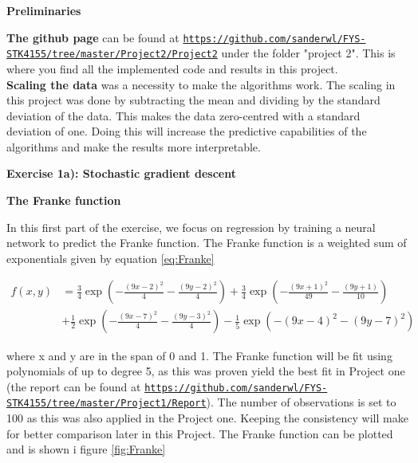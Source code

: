 \documentclass[12pt,a4paper]{article}
\begin{document}
\newpage

\begin{center}
\Large{\textbf{Preliminaries}}
\end{center}

\noindent \textbf{The github page} can be found at \href{{https://github.com/sanderwl/FYS-STK4155/tree/master/Project2/Project2}}{\nolinkurl{https://github.com/sanderwl/FYS-STK4155/tree/master/Project2/Project2}} under the folder "project 2". This is where you find all the implemented code and results in this project.
\\
\textbf{Scaling the data} was a necessity to make the algorithms work. The scaling in this project was done by subtracting the mean and dividing by the standard deviation of the data. This makes the data zero-centred with a standard deviation of one. Doing this will increase the predictive capabilities of the algorithms and make the results more interpretable.

\newpage

\begin{center}
\Large{\textbf{Exercise 1a): Stochastic gradient descent}}
\end{center}

\begin{center}
\large{\textbf{The Franke function}}
\end{center}

\noindent In this first part of the exercise, we focus on regression by training a neural network to predict the Franke function. The Franke function is a weighted sum of exponentials given by equation \ref{eq:Franke}

\begin{equation}\label{eq:Franke}
\begin{aligned}
f(x,y) &= \frac{3}{4}\exp{\left(-\frac{(9x-2)^2}{4} - \frac{(9y-2)^2}{4}\right)}+\frac{3}{4}\exp{\left(-\frac{(9x+1)^2}{49}- \frac{(9y+1)}{10}\right)} \\
&+\frac{1}{2}\exp{\left(-\frac{(9x-7)^2}{4} - \frac{(9y-3)^2}{4}\right)} -\frac{1}{5}\exp{\left(-(9x-4)^2 - (9y-7)^2\right) }
\end{aligned}
\end{equation}

\noindent where x and y are in the span of 0 and 1. The Franke function will be fit using polynomials of up to degree 5, as this was proven yield the best fit in Project one (the report can be found at \href{{https://github.com/sanderwl/FYS-STK4155/tree/master/Project1/Report}}{\nolinkurl{https://github.com/sanderwl/FYS-STK4155/tree/master/Project1/Report}}). The number of observations is set to 100 as this was also applied in the Project one. Keeping the consistency will make for better comparison later in this Project. The Franke function can be plotted and is shown i figure \ref{fig:Franke}
\end{document}

